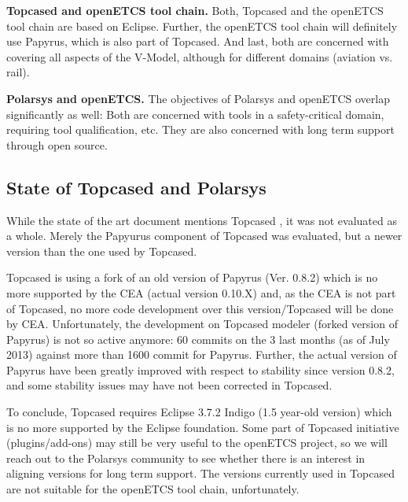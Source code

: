 \textbf{Topcased and openETCS tool chain.} Both, Topcased and the openETCS tool chain are based on Eclipse.  Further, the openETCS tool chain will definitely use Papyrus, which is also part of Topcased.  And last, both are concerned with covering all aspects of the V-Model, although for different domains (aviation vs. rail).

\textbf{Polarsys and openETCS.}  The objectives of Polarsys and openETCS overlap significantly as well: Both are concerned with tools in a safety-critical domain, requiring tool qualification, etc.  They are also concerned with long term support through open source.

\subsection{State of Topcased and Polarsys}

While the state of the art document mentions Topcased \cite{}, it was not evaluated as a whole.  Merely the Papyurus component of Topcased was evaluated, but a newer version than the one used by Topcased.

Topcased is using a fork of an old version of Papyrus (Ver. 0.8.2) which is no more supported by the CEA (actual version 0.10.X) and, as the CEA is not part of Topcased, no more code development over this version/Topcased will be done by CEA.  Unfortunately, the development on Topcased modeler (forked version of Papyrus) is not so active anymore: 60 commits on the 3 last months (as of July 2013) against more than 1600 commit for Papyrus.  Further, the actual version of Papyrus have been greatly improved with respect to stability since version 0.8.2, and some stability issues may have not been corrected in Topcased.

To conclude, Topcased requires Eclipse 3.7.2 Indigo (1.5 year-old version) which is no more supported by the Eclipse foundation.  Some part of Topcased initiative (plugins/add-ons) may still be very useful to the openETCS project, so we will reach out to the Polarsys community to see whether there is an interest in aligning versions for long term support.  The versions currently used in Topcased are not suitable for the openETCS tool chain, unfortunately.

